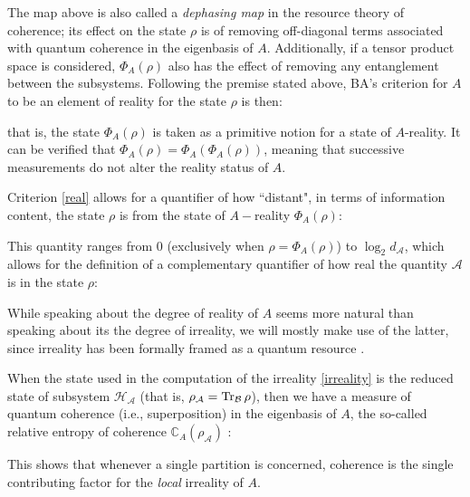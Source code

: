 \documentclass[12pt,a4paper,notitlepage]{report}
\begin{document}
%
The map above is also called a {\it dephasing map} in the resource theory of coherence; its effect on the state $\rho$ is of removing off-diagonal terms associated with quantum coherence in the eigenbasis of $A$. Additionally, if a tensor product space is considered, $\Phi_A(\rho)$ also has the effect of removing any entanglement between the subsystems. Following the premise stated above, BA's criterion for $A$ to be an element of reality for the state $\rho$ is then:

%
that is, the state $\Phi_A(\rho)$ is taken as a primitive notion for a state of $A$-reality. It can be verified that $\Phi_A(\rho) = \Phi_A(\Phi_A(\rho))$, meaning that successive measurements do not alter the reality status of $A$.

Criterion \eqref{real} allows for a quantifier of how ``distant", in terms of information content, the state $\rho$ is from the state of $A-$reality $\Phi_A(\rho)$:

%
This quantity ranges from 0 (exclusively when $\rho = \Phi_A(\rho)$) to $\log_2 d_{\mathcal{A}}$, which allows for the definition of a complementary quantifier of how real the quantity $\mathcal{A}$ is in the state $\rho$:

%
While speaking about the degree of reality of $A$ seems more natural than speaking about its the degree of irreality, we will mostly make use of the latter, since irreality has been formally framed as a quantum resource \cite{costa_angelo_2020}.

When the state used in the computation of the irreality \eqref{irreality} is the reduced state of subsystem $\mathcal{H}_{\mathcal{A}}$ (that is, $\rho_{\mathcal{A}} = \Tr_{\mathcal{B}}\rho$), then we have a measure of quantum coherence (i.e., superposition) in the eigenbasis of $A$, the so-called relative entropy of coherence $\mathbb{C}_A(\rho_{\mathcal{A}})$ \cite{baumgratz_2014, angelo_ribeiro_2015}:

%
This shows that whenever a single partition is concerned, coherence is the single contributing factor for the {\it local} irreality of $A$. 
\end{document}
